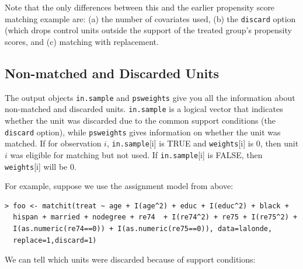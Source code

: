 \documentclass[oneside,letterpaper,titlepage]{article}
\begin{document}
Note that the only differences between this and the earlier propensity
score matching example are: (a) the number of covariates used, (b) the
\texttt{discard} option (which drops control units outside the support
of the treated group's propensity scores, and (c) matching with
replacement.

\subsection{Non-matched and Discarded Units}
The output objects \texttt{in.sample} and \texttt{psweights} give you
all the information about non-matched and discarded units.
\texttt{in.sample} is a logical vector that indicates whether the unit
was discarded due to the common support conditions (the
\texttt{discard} option), while \texttt{psweights} gives information
on whether the unit was matched.  If for observation $i$,
\texttt{in.sample}[i] is TRUE and \texttt{weights}[i] is $0$, then
unit $i$ was eligible for matching but not used.  If
\texttt{in.sample}[i] is FALSE, then \texttt{weights}[i] will be $0$.

For example, suppose we use the assignment model from above:

\begin{verbatim}
> foo <- matchit(treat ~ age + I(age^2) + educ + I(educ^2) + black +
  hispan + married + nodegree + re74  + I(re74^2) + re75 + I(re75^2) +
  I(as.numeric(re74==0)) + I(as.numeric(re75==0)), data=lalonde,
  replace=1,discard=1)
\end{verbatim}

We can tell which units were discarded because of support conditions:
\end{document}

